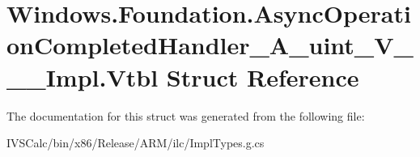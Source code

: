 \hypertarget{struct_windows_1_1_foundation_1_1_async_operation_completed_handler___a__uint___v_______impl_1_1_vtbl}{}\section{Windows.\+Foundation.\+Async\+Operation\+Completed\+Handler\+\_\+\+A\+\_\+uint\+\_\+\+V\+\_\+\+\_\+\+\_\+\+Impl.\+Vtbl Struct Reference}
\label{struct_windows_1_1_foundation_1_1_async_operation_completed_handler___a__uint___v_______impl_1_1_vtbl}


The documentation for this struct was generated from the following file\+:\begin{DoxyCompactItemize}
\item 
I\+V\+S\+Calc/bin/x86/\+Release/\+A\+R\+M/ilc/Impl\+Types.\+g.\+cs\end{DoxyCompactItemize}
